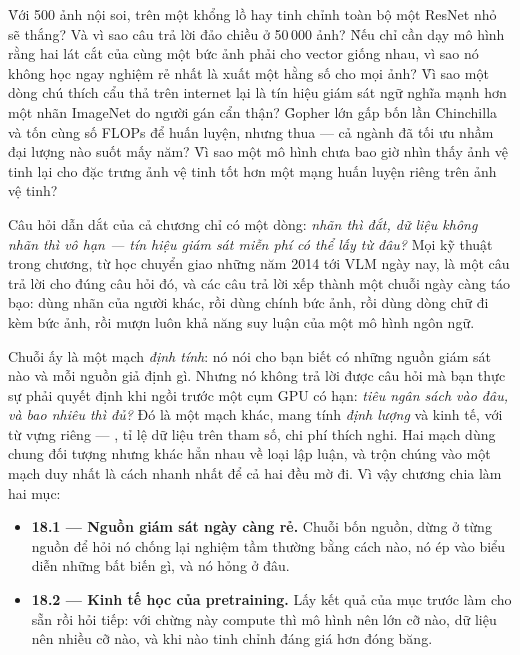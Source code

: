 \documentclass[../../deep_learning.tex]{subfiles}
\begin{document}
\begin{khoigoi}
\h{Với 500 ảnh nội soi,  trên một  khổng lồ hay tinh chỉnh toàn bộ một ResNet nhỏ sẽ thắng? Và vì sao câu trả lời đảo chiều ở 50\,000 ảnh?}
\h{Nếu chỉ cần dạy mô hình rằng hai lát cắt của cùng một bức ảnh phải cho vector giống nhau, vì sao nó không học ngay nghiệm rẻ nhất là xuất một hằng số cho mọi ảnh?}
\h{Vì sao một dòng chú thích cẩu thả trên internet lại là tín hiệu giám sát ngữ nghĩa mạnh hơn một nhãn ImageNet do người gán cẩn thận?}
\h{Gopher lớn gấp bốn lần Chinchilla và tốn cùng số FLOPs để huấn luyện, nhưng thua --- cả ngành đã tối ưu nhầm đại lượng nào suốt mấy năm?}
\h{Vì sao một mô hình chưa bao giờ nhìn thấy ảnh vệ tinh lại cho đặc trưng ảnh vệ tinh tốt hơn một mạng huấn luyện riêng trên ảnh vệ tinh?}
\end{khoigoi}

Câu hỏi dẫn dắt của cả chương chỉ có một dòng: \emph{nhãn thì đắt, dữ liệu không nhãn thì vô hạn --- tín hiệu giám sát miễn phí có thể lấy từ đâu?} Mọi kỹ thuật trong chương, từ học chuyển giao những năm 2014 tới VLM ngày nay, là một câu trả lời cho đúng câu hỏi đó, và các câu trả lời xếp thành một chuỗi ngày càng táo bạo: dùng nhãn của người khác, rồi dùng chính bức ảnh, rồi dùng dòng chữ đi kèm bức ảnh, rồi mượn luôn khả năng suy luận của một mô hình ngôn ngữ.

Chuỗi ấy là một mạch \emph{định tính}: nó nói cho bạn biết có những nguồn giám sát nào và mỗi nguồn giả định gì. Nhưng nó không trả lời được câu hỏi mà bạn thực sự phải quyết định khi ngồi trước một cụm GPU có hạn: \emph{tiêu ngân sách vào đâu, và bao nhiêu thì đủ?} Đó là một mạch khác, mang tính \emph{định lượng} và kinh tế, với từ vựng riêng --- , tỉ lệ dữ liệu trên tham số, chi phí thích nghi. Hai mạch dùng chung đối tượng nhưng khác hẳn nhau về loại lập luận, và trộn chúng vào một mạch duy nhất là cách nhanh nhất để cả hai đều mờ đi. Vì vậy chương chia làm hai mục:

\begin{itemize}
\item \textbf{18.1 --- Nguồn giám sát ngày càng rẻ.} Chuỗi bốn nguồn, dừng ở từng nguồn để hỏi nó chống lại nghiệm tầm thường bằng cách nào, nó ép vào biểu diễn những bất biến gì, và nó hỏng ở đâu.
\item \textbf{18.2 --- Kinh tế học của pretraining.} Lấy kết quả của mục trước làm cho sẵn rồi hỏi tiếp: với chừng này compute thì mô hình nên lớn cỡ nào, dữ liệu nên nhiều cỡ nào, và khi nào tinh chỉnh đáng giá hơn đóng băng.
\end{itemize}
\end{document}
